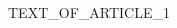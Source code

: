 \documentclass{article}
\date{\today}
\begin{document}
\maketitle

\begin{multicols}{3}


TEXT_OF_ARTICLE_1

\lipsum[100]

\closearticle

\end{multicols}
\end{document}
